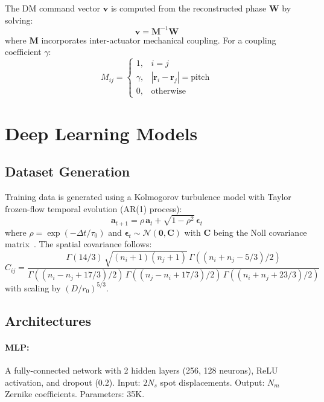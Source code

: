 \documentclass[twocolumn,10pt]{IEEEtran}
\begin{document}
The DM command vector $\mathbf{v}$ is computed from the reconstructed phase $\mathbf{W}$ by solving:
\begin{equation}
\mathbf{v} = \mathbf{M}^{-1}\mathbf{W}
\end{equation}
where $\mathbf{M}$ incorporates inter-actuator mechanical coupling. For a coupling coefficient $\gamma$:
\begin{equation}
M_{ij} = \begin{cases}
1, & i = j \\
\gamma, & |\mathbf{r}_i - \mathbf{r}_j| = \text{pitch} \\
0, & \text{otherwise}
\end{cases}
\end{equation}

\section{Deep Learning Models}
\label{sec:ml}

\subsection{Dataset Generation}
\label{sec:dataset}

Training data is generated using a Kolmogorov turbulence model with Taylor frozen-flow temporal evolution (AR(1) process):
\begin{equation}
\mathbf{a}_{t+1} = \rho\,\mathbf{a}_t + \sqrt{1-\rho^2}\,\boldsymbol{\epsilon}_t
\end{equation}
where $\rho = \exp(-\Delta t/\tau_0)$ and $\boldsymbol{\epsilon}_t \sim \mathcal{N}(\mathbf{0}, \mathbf{C})$ with $\mathbf{C}$ being the Noll covariance matrix~\cite{noll1976zernike}. The spatial covariance follows:
\begin{equation}
C_{ij} = \frac{\Gamma(14/3)\,\sqrt{(n_i+1)(n_j+1)}\,\Gamma((n_i+n_j-5/3)/2)}{\Gamma((n_i-n_j+17/3)/2)\,\Gamma((n_j-n_i+17/3)/2)\,\Gamma((n_i+n_j+23/3)/2)}
\end{equation}
with scaling by $(D/r_0)^{5/3}$.

\subsection{Architectures}
\label{sec:arch}

\paragraph{MLP:} A fully-connected network with 2 hidden layers (256, 128 neurons), ReLU activation, and dropout (0.2). Input: $2N_s$ spot displacements. Output: $N_m$ Zernike coefficients. Parameters: 35K.
\end{document}
